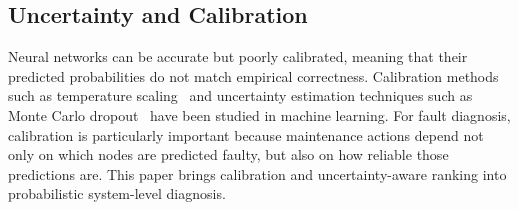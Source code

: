 \subsection{Uncertainty and Calibration}
Neural networks can be accurate but poorly calibrated, meaning that their predicted probabilities do not match empirical correctness. Calibration methods such as temperature scaling~\cite{guo2017calibration} and uncertainty estimation techniques such as Monte Carlo dropout~\cite{gal2016dropout} have been studied in machine learning. For fault diagnosis, calibration is particularly important because maintenance actions depend not only on which nodes are predicted faulty, but also on how reliable those predictions are. This paper brings calibration and uncertainty-aware ranking into probabilistic system-level diagnosis.